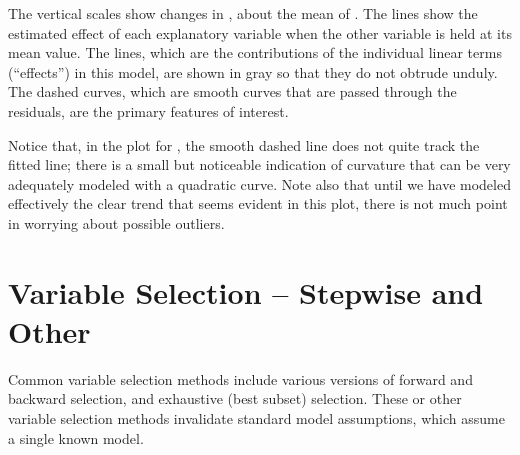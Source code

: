 The vertical scales show changes in , about the mean of
.  The lines show the estimated effect of each explanatory
variable when the other variable is held at its mean value.  The
lines, which are the contributions of the individual linear terms
(``effects'') in this model, are shown in gray so that they do not
obtrude unduly. The dashed curves, which are smooth curves that are
passed through the residuals, are the primary features of interest.

Notice that, in the plot for , the smooth dashed line does
not quite track the fitted line; there is a small but noticeable
indication of curvature that can be very adequately modeled with a
quadratic curve.  Note also that until we have modeled effectively the
clear trend that seems evident in this plot, there is not much
point in worrying about possible outliers.

\section{Variable Selection -- Stepwise and Other}\label{ss:varsel}

Common variable selection methods include various versions of forward
and backward selection, and exhaustive (best subset) selection.  These
or other variable selection methods invalidate standard model
assumptions, which assume a single known model.

